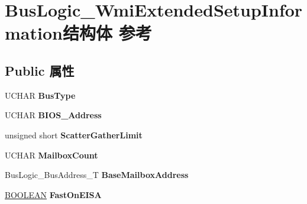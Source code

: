 \hypertarget{struct_bus_logic___wmi_extended_setup_information}{}\section{Bus\+Logic\+\_\+\+Wmi\+Extended\+Setup\+Information结构体 参考}
\label{struct_bus_logic___wmi_extended_setup_information}
\subsection*{Public 属性}
\begin{DoxyCompactItemize}
\item 
\mbox{\label{struct_bus_logic___wmi_extended_setup_information_a4333d3ab4fdf500d8d502141580c6566}} 
U\+C\+H\+AR {\bfseries Bus\+Type}
\item 
\mbox{\label{struct_bus_logic___wmi_extended_setup_information_ac7065a064f90c4e633df2818af5a6c79}} 
U\+C\+H\+AR {\bfseries B\+I\+O\+S\+\_\+\+Address}
\item 
\mbox{\label{struct_bus_logic___wmi_extended_setup_information_a312f8163166bfc363209ad31fa03c7c5}} 
unsigned short {\bfseries Scatter\+Gather\+Limit}
\item 
\mbox{\label{struct_bus_logic___wmi_extended_setup_information_aa4c814235674d8c8001517b396d1efd3}} 
U\+C\+H\+AR {\bfseries Mailbox\+Count}
\item 
\mbox{\label{struct_bus_logic___wmi_extended_setup_information_ac6b992284c4bbb0878bc209353f17cbd}} 
Bus\+Logic\+\_\+\+Bus\+Address\+\_\+T {\bfseries Base\+Mailbox\+Address}
\item 
\mbox{\label{struct_bus_logic___wmi_extended_setup_information_a51c718d632efb72ee5d2dfc58e20cae3}} 
\hyperlink{_processor_bind_8h_a112e3146cb38b6ee95e64d85842e380a}{B\+O\+O\+L\+E\+AN} {\bfseries Fast\+On\+E\+I\+SA}
\item 
\mbox{\label{struct_bus_logic___wmi_extended_setup_information_aaf7914c8b4d8b82703607fe8e36aa9b7}} 

\end{DoxyCompactItemize}
